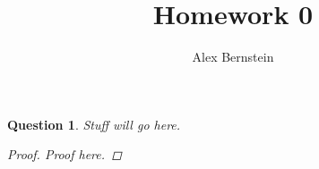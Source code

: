 \documentclass[10pt,letterpaper]{article}
\author{Alex Bernstein}
\title{Homework 0}
\newtheorem{problems}{Question}
\begin{document}
\begin{problems}
Stuff will go here.
\begin{proof}
Proof here.
\end{proof}
\end{problems}
\end{document}
